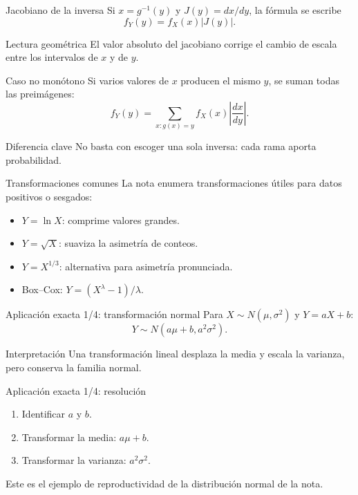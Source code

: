 \documentclass[10pt,aspectratio=169]{beamer}
\begin{document}
\begin{frame}{Jacobiano de la inversa}
  \footnotesize
  Si $x=g^{-1}(y)$ y $J(y)=dx/dy$, la fórmula se escribe
  \[
    f_Y(y)=f_X(x)|J(y)|.
  \]
  \begin{exampleblock}{Lectura geométrica}
    El valor absoluto del jacobiano corrige el cambio de escala entre los
    intervalos de $x$ y de $y$.
  \end{exampleblock}
\end{frame}

\begin{frame}{Caso no monótono}
  \footnotesize
  Si varios valores de $x$ producen el mismo $y$, se suman todas las
  preimágenes:
  \[
    f_Y(y)=\sum_{x:g(x)=y}f_X(x)\left|\frac{dx}{dy}\right|.
  \]
  \begin{alertblock}{Diferencia clave}
    No basta con escoger una sola inversa: cada rama aporta probabilidad.
  \end{alertblock}
\end{frame}

\begin{frame}{Transformaciones comunes}
  \footnotesize
  La nota enumera transformaciones útiles para datos positivos o sesgados:
  \begin{itemize}\itemsep=0.11cm
    \item $Y=\ln X$: comprime valores grandes.
    \item $Y=\sqrt X$: suaviza la asimetría de conteos.
    \item $Y=X^{1/3}$: alternativa para asimetría pronunciada.
    \item Box--Cox: $Y=(X^\lambda-1)/\lambda$.
  \end{itemize}
\end{frame}

\begin{frame}{Aplicación exacta 1/4: transformación normal}
  \footnotesize
  Para $X\sim N(\mu,\sigma^2)$ y $Y=aX+b$:
  \[
    Y\sim N(a\mu+b,a^2\sigma^2).
  \]
  \begin{block}{Interpretación}
    Una transformación lineal desplaza la media y escala la varianza, pero
    conserva la familia normal.
  \end{block}
\end{frame}

\begin{frame}{Aplicación exacta 1/4: resolución}
  \footnotesize
  \begin{enumerate}\itemsep=0.13cm
    \item Identificar $a$ y $b$.
    \item Transformar la media: $a\mu+b$.
    \item Transformar la varianza: $a^2\sigma^2$.
  \end{enumerate}
  Este es el ejemplo de reproductividad de la distribución normal de la nota.
\end{frame}
\end{document}
